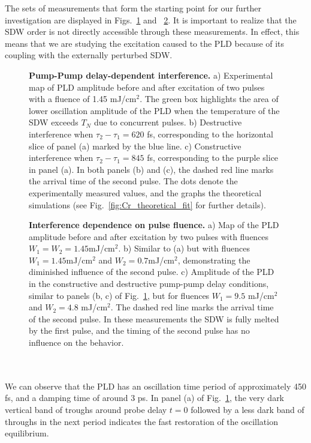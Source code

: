 The sets of measurements that form the starting point for our further investigation are displayed in Figs.~\ref{fig:Cr_experimental1} and ~\ref{fig:Cr_experimental2}.
It is important to realize that the SDW order is not directly accessible through these measurements. In effect, this means that we are studying the excitation caused to the PLD because of its coupling with the externally perturbed SDW.
\begin{figure}
	\centering
{}
\caption{\label{fig:Cr_experimental1}{\bf Pump-Pump delay-dependent interference.} a) Experimental map of PLD amplitude before and after excitation of two pulses with a fluence of 1.45 mJ/cm$^2$. The green box highlights the area of lower oscillation amplitude of the PLD when the temperature of the SDW exceeds $T_N$ due to concurrent pulses. b) Destructive interference when $\tau_2 - \tau_1 = 620$ fs, corresponding to the horizontal slice of panel (a) marked by the blue line. c) Constructive interference when $\tau_2 - \tau_1 = 845$ fs, corresponding to the purple slice in panel (a). In both panels (b) and (c), the dashed red line marks the arrival time of the second pulse. The dots denote the experimentally measured values, and the graphs the theoretical simulations (see Fig.~\ref{fig:Cr_theoretical_fit} for further details).}
\end{figure}
\begin{figure}
	\centering
{}
\caption{\label{fig:Cr_experimental2}{\bf Interference dependence on pulse fluence.} a) Map of the PLD amplitude before and after excitation by two pulses with fluences $W_1=W_2=1.45$mJ/cm$^2$. b) Similar to (a) but with fluences $W_1=1.45$mJ/cm$^2$ and $W_2=0.7$mJ/cm$^2$, demonstrating the diminished influence of the second pulse. c) Amplitude of the PLD in the constructive and destructive pump-pump delay conditions, similar to panels (b, c) of Fig.~\ref{fig:Cr_experimental1}, but for fluences $W_1 = 9.5$ mJ/cm$^2$ and $W_2 = 4.8$ mJ/cm$^2$. The dashed red line marks the arrival time of the second pulse. In these measurements the SDW is fully melted by the first pulse, and the timing of the second pulse has no influence on the behavior.}
\end{figure}
\\\\
We can observe that the PLD has an oscillation time period of approximately 450 fs, and a damping time of around 3 ps.
In panel (a) of Fig.~\ref{fig:Cr_experimental1}, the very dark vertical band of troughs around probe delay $t = 0$ followed by a less dark band of throughs in the next period indicates the fast restoration of the oscillation equilibrium. 
